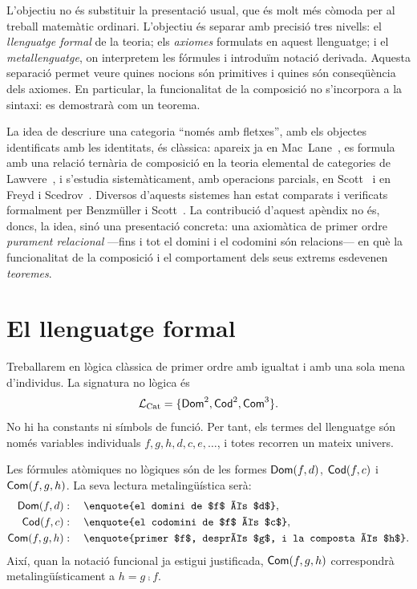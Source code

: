 L'objectiu no és substituir la presentació usual, que és molt més còmoda per al treball matemàtic ordinari. L'objectiu és separar amb precisió tres nivells: el \emph{llenguatge formal} de la teoria; els \emph{axiomes} formulats en aquest llenguatge; i el \emph{metallenguatge}, on interpretem les fórmules i introduïm notació derivada. Aquesta separació permet veure quines nocions són primitives i quines són conseqüència dels axiomes. En particular, la funcionalitat de la composició no s'incorpora a la sintaxi: es demostrarà com un teorema.

\begin{nota}
La idea de descriure una categoria \enquote{només amb fletxes}, amb els objectes identificats amb les identitats, és clàssica: apareix ja en Mac~Lane~\cite{maclane}, es formula amb una relació ternària de composició en la teoria elemental de categories de Lawvere~\cite{lawvere-ccfm}, i s'estudia sistemàticament, amb operacions parcials, en Scott~\cite{scott-identity} i en Freyd i Scedrov~\cite{freydscedrov}. Diversos d'aquests sistemes han estat comparats i verificats formalment per Benzmüller i Scott~\cite{BS2020,BSAFP}. La contribució d'aquest apèndix no és, doncs, la idea, sinó una presentació concreta: una axiomàtica de primer ordre \emph{purament relacional} ---fins i tot el domini i el codomini són relacions--- en què la funcionalitat de la composició i el comportament dels seus extrems esdevenen \emph{teoremes}.
\end{nota}

\section{El llenguatge formal}
\label{sec:ar-llenguatge}

Treballarem en lògica clàssica de primer ordre amb igualtat i amb una sola mena d'individus. La signatura no lògica és
\[
\mathcal L_{\mathrm{Cat}}
=
\{\mathsf{Dom}^{2},\mathsf{Cod}^{2},\mathsf{Com}^{3}\}.
\]
No hi ha constants ni símbols de funció. Per tant, els termes del llenguatge són només variables individuals $f,g,h,d,c,e,\dots$, i totes recorren un mateix univers.

Les fórmules atòmiques no lògiques són de les formes $\mathsf{Dom}(f,d)$, $\mathsf{Cod}(f,c)$ i $\mathsf{Com}(f,g,h)$. La seva lectura metalingüística serà:
\begin{align*}
\Dom(f,d)&:\quad \text{\enquote{el domini de $f$ és $d$}},\\
\Cod(f,c)&:\quad \text{\enquote{el codomini de $f$ és $c$}},\\
\Com(f,g,h)&:\quad \text{\enquote{primer $f$, després $g$, i la composta és $h$}}.
\end{align*}
Així, quan la notació funcional ja estigui justificada, $\mathsf{Com}(f,g,h)$ correspondrà metalingüísticament a $h=g\comp f$.

